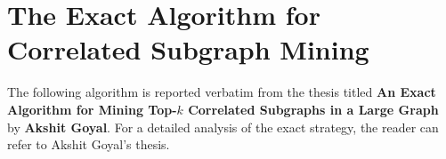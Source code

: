 \documentclass[MTech]{iitddiss}
\begin{document}






\vspace{-4mm}









%   
% 
% 





\appendix

\chapter{The Exact Algorithm for Correlated Subgraph Mining}

The following algorithm is reported verbatim from the thesis titled 
\textbf{An Exact Algorithm for Mining Top-$k$ Correlated Subgraphs in a Large
Graph} by \textbf{Akshit Goyal}. For a detailed analysis of the exact
strategy, the reader can refer to Akshit Goyal's thesis. 
\end{document}
